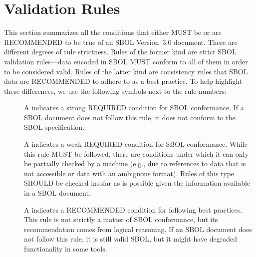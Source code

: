 \newcommand{\printValid}{\validRule{sbol3-\arabic{sbolCtr}\addtocounter{sbolCtr}{1}}}
\newcommand{\printComplete}{\completeRule{sbol3-\arabic{sbolCtr}\addtocounter{sbolCtr}{1}}}
\newcommand{\printWarning}{\consistencyRule{sbol3-\arabic{sbolCtr}\addtocounter{sbolCtr}{1}}}
\newcommand{\printModeling}{\modelingRule{sbol3-\arabic{sbolCtr}\addtocounter{sbolCtr}{1}}}

\section{Validation Rules}
\label{validation}

This section summarizes all the conditions that either MUST be or 
are RECOMMENDED to be true of an SBOL Version~3.0 document. There are different degrees of rule strictness.  
Rules of the former kind are strict SBOL validation rules---data encoded in SBOL MUST conform to
all of them in order to be considered valid. Rules of the latter kind
are consistency rules that SBOL data are RECOMMENDED to adhere to as a best practice.  To help highlight these differences, we use the
following symbols next to the rule numbers:


\begin{description}
\item[\hspace*{6.5pt}\vSymbol\vsp] A \vSymbolName indicates a strong
  REQUIRED condition for SBOL conformance. If a SBOL document does not follow this rule, it does not conform to the SBOL
  specification.  

\item[\hspace*{6.5pt}\rSymbol\rsp] A \rSymbolName indicates a weak
  REQUIRED condition for SBOL conformance. While this rule MUST be followed, there are conditions under which it can only be partially checked by a machine (e.g., due to references to data that is not accessible or data with an ambiguous format). 
  Rules of this type SHOULD be checked insofar as is possible given the information available in a SBOL document.

\item[\hspace*{6.5pt}\mSymbol\msp] A \mSymbolName indicates a 
  RECOMMENDED condition for following best practices.  This rule is not strictly a matter of SBOL conformance, but its recommendation comes from logical
  reasoning.  If an SBOL document does not follow this rule, it is still valid SBOL, but it might have degraded functionality in some tools.  
\end{description}

